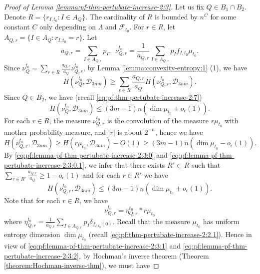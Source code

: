 \documentclass[a4paper,11pt]{amsart}
\theoremstyle{definition}
\numberwithin{equation}{section}
\def\D{\mathcal{D}}
\def\F{\mathcal F}
\begin{document}
\begin{proof}[Proof of Lemma \ref{lemma:pf-thm-pertubate-increase-2:3}]

Let us fix $Q\in B_1\cap B_2$.  Denote $R=\{r_{I,t_0}:I\in A_Q\}$.   The   cardinality of $R$ is bounded by $n^{C}$ for some constant $C$ only depending on $\Lambda$ and $\F_{t_0}$.
For $r\in R$, let $A_{Q,r}=\{I\in A_Q: r_{I,t_0}=r\}$.   Let 
\[
a_{Q,r} = \sum_{I\in A_{Q,r}}p_I,  \  \   \nu_{Q,r} ^{t_0}= \frac{1}{a_{Q,r}}\sum_{I\in A_{Q,r}} p_I f_{I,t_0} \mu_{t_0}. 
\]
Since $\nu_{Q}^{t_0}=\sum_{r\in R}\frac{a_{Q,r}}{a_Q}\nu_{Q,r}^{t_0}$,   by Lemma \ref{lemma:convexity-entropy:1} (1),  we have 
\[
H(\nu_{Q}^{t_0},\D_{3nm}) \ge \sum_{r\in R} \frac{a_{Q,r}}{a_Q}H(\nu_{Q,r} ^{t_0},\D_{3nm}). 
\]
Since $Q\in B_2$,  we have (recall \eqref{eq:pf:thm-pertubate-increase-2:7})
\begin{equation}\label{eq:pf:lemma-pf-thm-pertubate-increase-2:3:0}
H(\nu_Q^{t_0},  \D_{3nm}) \le  (3m-1)n (\dim \mu_{t_0} +o_\epsilon(1)).
\end{equation}
 For each $r\in R$, the measure $\nu_{Q,r} ^{t_0}$ is the convolution of the measure $r\mu_{t_0}$ with another probability measure,  and $|r|$ is about $2^{-n}$,  hence we have
 \begin{equation}\label{eq:pf:lemma-pf-thm-pertubate-increase-2:3:0.1}
H(\nu_{Q,r}^{t_0},  \D_{3nm}) \ge H(r\mu_{t_0},\D_{3nm})-O(1) \ge (3m-1)n (\dim \mu_{t_0} -o_\epsilon(1)).
\end{equation}
By \eqref{eq:pf:lemma-pf-thm-pertubate-increase-2:3:0} and \eqref{eq:pf:lemma-pf-thm-pertubate-increase-2:3:0.1},  we infer that there exists $R'\subset R$ such that $\sum_{r\in R'} \frac{a_{Q,r}}{a_Q} \ge 1-o_\epsilon(1) $ and for each $r\in R'$ we have
\begin{equation}\label{eq:pf:lemma-pf-thm-pertubate-increase-2:3:1}
H(\nu_{Q,r}^{t_0},  \D_{3nm}) \le  (3m-1)n (\dim \mu_{t_0} +o_\epsilon(1)).
\end{equation}
Note that for each $r\in R$, we have
\begin{equation}\label{eq:pf:lemma-pf-thm-pertubate-increase-2:3:2}
\nu_{Q,r}^{t_0} =\eta_{Q,r}^{t_0}* r\mu_{t_0}
\end{equation}
where $\eta_{Q,r}^{t_0}=\frac{1}{a_{Q,r}}\sum_{I\in A_{Q,r}}p_I \delta_{f_{I,t_0}(0)}$.
Recall that the measure $\mu_{t_0} $ has uniform entropy dimension $\dim\mu_{t_0}$ (recall \eqref{eq:pf:thm-pertubate-increase-2:2.1}).  Hence in view of \eqref{eq:pf:lemma-pf-thm-pertubate-increase-2:3:1} and \eqref{eq:pf:lemma-pf-thm-pertubate-increase-2:3:2}, by Hochman's inverse theorem  (Theorem \ref{theorem:Hochman-inverse-thm}),  we must have 

\end{proof}
\end{document}
